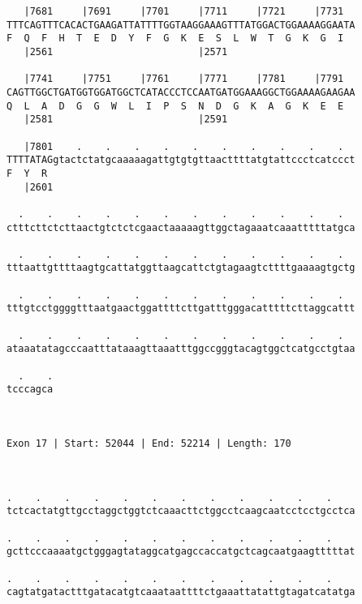 \documentclass{article}
\begin{document}
\begin{Verbatim}
   |7681     |7691     |7701     |7711     |7721     |7731  
TTTCAGTTTCACACTGAAGATTATTTTGGTAAGGAAAGTTTATGGACTGGAAAAGGAATA
F  Q  F  H  T  E  D  Y  F  G  K  E  S  L  W  T  G  K  G  I  
   |2561                         |2571                      
  
   |7741     |7751     |7761     |7771     |7781     |7791  
CAGTTGGCTGATGGTGGATGGCTCATACCCTCCAATGATGGAAAGGCTGGAAAAGAAGAA
Q  L  A  D  G  G  W  L  I  P  S  N  D  G  K  A  G  K  E  E  
   |2581                         |2591                      
  
   |7801    .    .    .    .    .    .    .    .    .    .  
TTTTATAGgtactctatgcaaaaagattgtgtgttaacttttatgtattccctcatccct
F  Y  R                                                     
   |2601                                                    
  
  .    .    .    .    .    .    .    .    .    .    .    .  
ctttcttctcttaactgtctctcgaactaaaaagttggctagaaatcaaatttttatgca
                                                            
  .    .    .    .    .    .    .    .    .    .    .    .  
tttaattgttttaagtgcattatggttaagcattctgtagaagtcttttgaaaagtgctg
                                                            
  .    .    .    .    .    .    .    .    .    .    .    .  
tttgtcctggggtttaatgaactggattttcttgatttgggacatttttcttaggcattt
                                                            
  .    .    .    .    .    .    .    .    .    .    .    .  
ataaatatagcccaatttataaagttaaatttggccgggtacagtggctcatgcctgtaa
                                                            
  .    .
tcccagca
        
        
 
Exon 17 | Start: 52044 | End: 52214 | Length: 170



.    .    .    .    .    .    .    .    .    .    .    .    
tctcactatgttgcctaggctggtctcaaacttctggcctcaagcaatcctcctgcctca
                                                            
.    .    .    .    .    .    .    .    .    .    .    .    
gcttcccaaaatgctgggagtataggcatgagccaccatgctcagcaatgaagtttttat
                                                            
.    .    .    .    .    .    .    .    .    .    .    .    
cagtatgatactttgatacatgtcaaataattttctgaaattatattgtagatcatatga
                                                            

\end{Verbatim}
\end{document}

